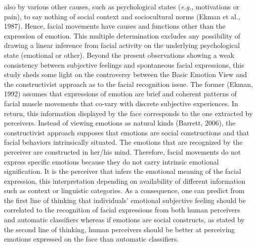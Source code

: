 \documentclass[
  english,
  man]{apa7}
\begin{document}
also by various other causes, such as psychological states (\emph{e.g.}, motivations or pain), to say nothing of social context and sociocultural norms (Ekman et al., 1987). Hence, facial movements have causes and functions other than the expression of emotion. This multiple determination excludes any possibility of drawing a linear inference from facial activity on the underlying psychological state (emotional or other). Beyond the present observations showing a weak consistency between subjective feelings and spontaneous facial expressions, this study sheds some light on the controversy between the Basic Emotion View and the constructivist approach as to the facial recognition issue. The former (Ekman, 1992) assumes that expressions of emotion are brief and coherent patterns of facial muscle movements that co-vary with discrete subjective experiences. In return, this information displayed by the face corresponds to the one extracted by perceivers. Instead of viewing emotions as natural kinds (Barrett, 2006), the constructivist approach supposes that emotions are social constructions and that facial behaviors intrinsically situated. The emotions that are recognized by the perceiver are constructed in her/his mind. Therefore, facial movements do not express specific emotions because they do not carry intrinsic emotional signification. It is the perceiver that infers the emotional meaning of the facial expression, this interpretation depending on availability of different information such as context or linguistic categories. As a consequence, one can predict from the first line of thinking that individuals' emotional subjective feeling should be correlated to the recognition of facial expressions from both human perceivers and automatic classifiers whereas if emotions are social constructs, as stated by the second line of thinking, human perceivers should be better at perceiving emotions expressed on the face than automatic classifiers.
\end{document}
